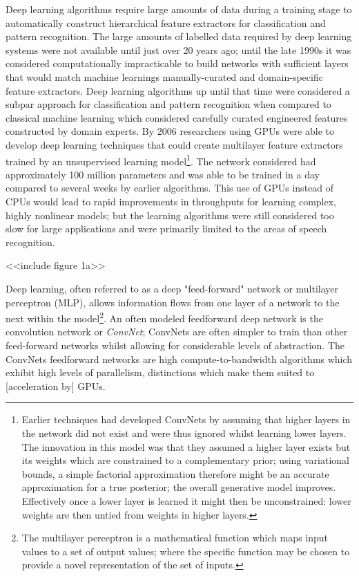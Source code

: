 \documentclass[7pt]{article}
\begin{document}
    Deep learning algorithms require large amounts of data during a training stage to automatically construct hierarchical feature extractors for classification and pattern recognition. The large amounts of labelled data required by deep learning systems were not available until just over 20 years ago; until the late 1990s it was considered computationally impracticable to build networks with sufficient layers that would  match machine learnings manually-curated and domain-specific feature extractors. {Deep learning algorithms up until that time were considered a subpar approach for classification and pattern recognition when compared to classical machine learning which considered carefully curated engineered features constructed by domain experts.} By 2006 researchers using GPUs were able to  develop deep learning techniques that could create multilayer feature extractors trained by an unsupervised learning model\footnote{Earlier techniques had developed ConvNets by assuming that higher layers in the network did not exist and were thus ignored whilst learning lower layers. The innovation in this model was that they assumed a higher layer exists but its weights which are  constrained to a complementary prior; using variational bounds, a simple factorial approximation therefore might be an accurate approximation for a true posterior; the overall generative model improves. Effectively once a lower layer is learned it might then be unconstrained: lower weights are then untied from weights in higher layers.}. The network considered had approximately 100 million parameters and was able to be trained in a day compared to several weeks by earlier algorithms.  This use of GPUs instead of CPUs would lead to rapid improvements in throughputs for learning complex, highly nonlinear models; but the learning algorithms were still considered too slow for large applications and were primarily limited to the areas of speech recognition. 

<<include figure 1a>>

 Deep learning, often referred to as a deep "feed-forward" network or multilayer perceptron (MLP), allows information flows from one layer of a network to the next within the model\footnote{The multilayer perceptron is a mathematical function which maps input values to a set of output values; where the specific function may be chosen to  provide a novel representation of the set of inputs.}. An often modeled feedforward deep network is the convolution network or  \emph{ConvNet}; ConvNets are often simpler to train than other feed-forward networks whilst allowing for considerable levels of abstraction. The ConvNets feedforward networks are high compute-to-bandwidth algorithms which exhibit high levels of parallelism, distinctions which make them suited to [acceleration by] GPUs. 
 
\end{document}
